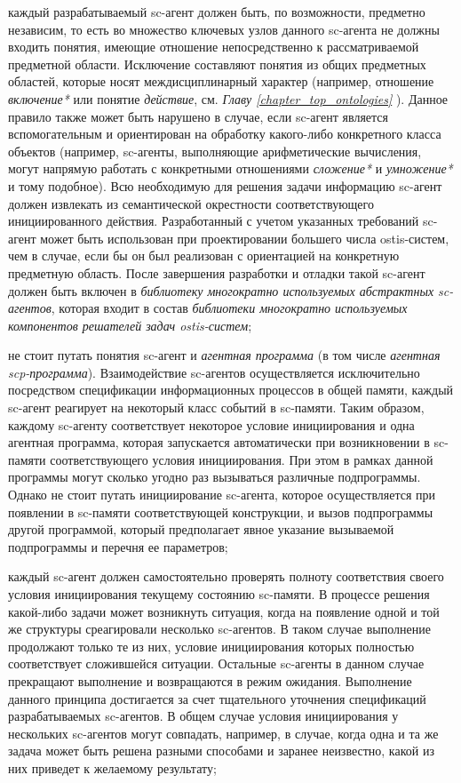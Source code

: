\begin{textitemize}
\item каждый разрабатываемый sc-агент должен быть, по возможности, предметно независим, то есть во множество ключевых узлов данного sc-агента не должны входить понятия, имеющие отношение непосредственно к рассматриваемой предметной области. Исключение составляют понятия из общих предметных областей, которые носят междисциплинарный характер (например, отношение \textit{включение*} или понятие \textit{действие}, см. \textit{Главу \ref{chapter_top_ontologies} }). Данное правило также может быть нарушено в случае, если sc-агент является вспомогательным и ориентирован на обработку какого-либо конкретного класса объектов (например, sc-агенты, выполняющие арифметические вычисления, могут напрямую работать с конкретными отношениями \textit{сложение*} и \textit{умножение*} и тому подобное). Всю необходимую для решения задачи информацию sc-агент должен извлекать из семантической окрестности соответствующего инициированного действия. Разработанный с учетом указанных требований sc-агент может быть использован при проектировании большего числа ostis-систем, чем в случае, если бы он был реализован с ориентацией на конкретную предметную область. После завершения разработки и отладки такой sc-агент должен быть включен в \textit{библиотеку многократно используемых абстрактных sc-агентов}, которая входит в состав \textit{библиотеки многократно используемых компонентов решателей задач ostis-систем};
\item не стоит путать понятия sc-агент и \textit{агентная программа} (в том числе \textit{агентная scp-программа}). Взаимодействие sc-агентов осуществляется исключительно посредством спецификации информационных процессов в общей памяти, каждый sc-агент реагирует на некоторый класс событий в sc-памяти. Таким образом, каждому sc-агенту соответствует некоторое условие инициирования и одна агентная программа, которая запускается автоматически при возникновении в sc-памяти соответствующего условия инициирования. При этом в рамках данной программы могут сколько угодно раз вызываться различные подпрограммы. Однако не стоит путать инициирование sc-агента, которое осуществляется при появлении в sc-памяти соответствующей конструкции, и вызов подпрограммы другой программой, который предполагает явное указание вызываемой подпрограммы и перечня ее параметров;
\item каждый sc-агент должен самостоятельно проверять полноту соответствия своего условия инициирования текущему состоянию sc-памяти. В процессе решения какой-либо задачи может возникнуть ситуация, когда на появление одной и той же структуры среагировали несколько sc-агентов. В таком случае выполнение продолжают только те из них, условие инициирования которых полностью соответствует сложившейся ситуации. Остальные sc-агенты в данном случае прекращают выполнение и возвращаются в режим ожидания. Выполнение данного принципа достигается за счет тщательного уточнения спецификаций разрабатываемых sc-агентов. В общем случае условия инициирования у нескольких sc-агентов могут совпадать, например, в случае, когда одна и та же задача может быть решена разными способами и заранее неизвестно, какой из них приведет к желаемому результату;

\end{textitemize}
